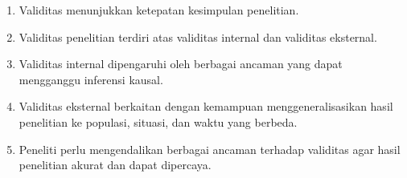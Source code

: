 \documentclass[
  indonesian,
  letterpaper,
  DIV=11,
  numbers=noendperiod]{scrreprt}
\providecommand{\tightlist}{%
  \setlength{\itemsep}{0pt}\setlength{\parskip}{0pt}}
\begin{document}
\begin{tcolorbox}[enhanced jigsaw, colframe=quarto-callout-tip-color-frame, toptitle=1mm, breakable, leftrule=.75mm, arc=.35mm, toprule=.15mm, colback=white, colbacktitle=quarto-callout-tip-color!10!white, bottomtitle=1mm, bottomrule=.15mm, titlerule=0mm, title=\textcolor{quarto-callout-tip-color}{\faLightbulb}\hspace{0.5em}{Rangkuman}, coltitle=black, left=2mm, opacitybacktitle=0.6, opacityback=0, rightrule=.15mm]

\begin{enumerate}
\def\labelenumi{\arabic{enumi}.}
\tightlist
\item
  Validitas menunjukkan ketepatan kesimpulan penelitian.
\item
  Validitas penelitian terdiri atas validitas internal dan validitas
  eksternal.
\item
  Validitas internal dipengaruhi oleh berbagai ancaman yang dapat
  mengganggu inferensi kausal.
\item
  Validitas eksternal berkaitan dengan kemampuan menggeneralisasikan
  hasil penelitian ke populasi, situasi, dan waktu yang berbeda.
\item
  Peneliti perlu mengendalikan berbagai ancaman terhadap validitas agar
  hasil penelitian akurat dan dapat dipercaya.
\end{enumerate}

\end{tcolorbox}
\end{document}
